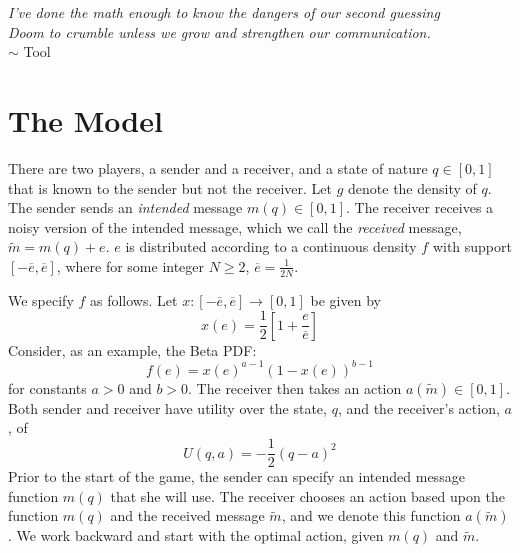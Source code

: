 \documentclass{article}
\begin{document}
\noindent\textit{I've done the math enough to know the dangers of our second guessing}\\
\textit{Doom to crumble unless we grow and strengthen our communication.}\\

\hspace{.8\textwidth}$\sim$ Tool

\section{The Model}

There are two players, a sender and a receiver, and a state of nature $q\in [ 0,1]$ that is known to the sender but not the receiver. Let $g$ denote the density of $q$. The sender sends an \textit{intended} message $m(q)\in [ 0,1]$. The receiver receives a noisy version of the intended message, which we call the \textit{received} message, $\widetilde{m} =m(q)+e$. $e$ is distributed according to a continuous density $ f$ with support $[-\overline{e },\overline{e }]$, where for some integer $N\geq2$, $\overline{e}=\frac{1}{2N}$. 

We specify $f$ as follows. Let $x:[-\overline{e},\overline{e}]\rightarrow[0,1]$ be given by
\begin{equation}
	x(e)=\frac{1}{2}\left[1+\frac{e}{\overline{e}}\right]
\end{equation}
Consider, as an example, the Beta PDF:
\begin{equation}
	f(e)=x(e)^{a-1}(1-x(e))^{b-1}
\end{equation}
for constants $a>0$ and $b>0$. The receiver then takes an action $a(\widetilde{m})\in[0,1]$. Both sender and receiver have utility over the state, $q$, and the receiver's action, $a$, of 
\begin{equation}
	U(q,a)=-\frac{1}{2}(q-a)^{2}
\end{equation}
Prior to the start of the game, the sender can specify an intended message function $m(q)$ that she will use. The receiver chooses an action based upon the function $m(q)$ and the received message $\widetilde{m}$, and we denote this function $a(\widetilde{m})$. We work backward and start with the optimal action, given $m(q)$ and $\widetilde{m}$.
\end{document}
